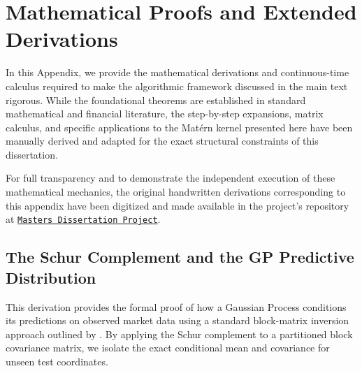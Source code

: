 \documentclass[12pt,oneside]{report}
\theoremstyle{definition}
\theoremstyle{remark}
\begin{document}

\chapter{Mathematical Proofs and Extended Derivations}
In this Appendix, we provide the mathematical derivations and continuous-time calculus required to make the algorithmic framework discussed in the main text rigorous. While the foundational theorems are established in standard mathematical and financial literature, the step-by-step expansions, matrix calculus, and specific applications to the Matérn kernel presented here have been manually derived and adapted for the exact structural constraints of this dissertation. 

For full transparency and to demonstrate the independent execution of these mathematical mechanics, the original handwritten derivations corresponding to this appendix have been digitized and made available in the project's repository at \href{https://github.com/mishavelial/Masters-Dissertation-Project}{\texttt{Masters Dissertation Project}}.

\section{The Schur Complement and the GP Predictive Distribution}
\label{sec:schur_complement}

This derivation provides the formal proof of how a Gaussian Process conditions its predictions on observed market data using a standard block-matrix inversion approach outlined by \citet{rasmussen2006gp}. By applying the Schur complement to a partitioned block covariance matrix, we isolate the exact conditional mean and covariance for unseen test coordinates.
\end{document}
